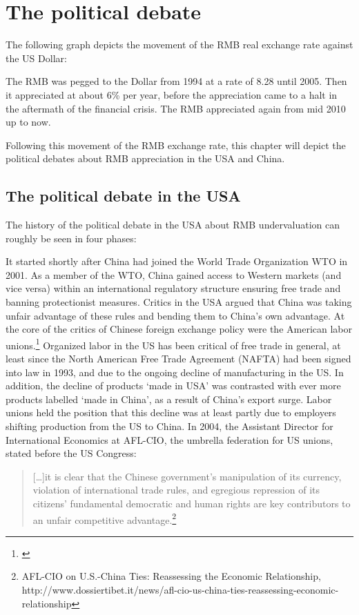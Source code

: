 \section{The political debate}
\label{sec:politics}

The following graph depicts the movement of the RMB real exchange rate against the US Dollar:


The RMB was pegged to the Dollar from 1994 at a rate of 8.28 until 2005. Then it appreciated at about 6\% per year, before the appreciation came to a halt in the aftermath of the financial crisis. The RMB appreciated again from mid 2010 up to now.

Following this movement of the RMB exchange rate, this chapter will depict the political debates about RMB appreciation in the USA and China.


\subsection{The political debate in the USA}

The history of the political debate in the USA about RMB undervaluation can roughly be seen in four phases:

It started shortly after China had joined the World Trade Organization WTO in 2001. As a member of the WTO, China gained access to Western markets (and vice versa) within an international regulatory structure ensuring free trade and banning protectionist measures. Critics in the USA argued that China was taking unfair advantage of these rules and bending them to China's own advantage. At the core of the critics of Chinese foreign exchange policy were the American labor unions.\footnote{\cite[pp. 14]{Levy2011}} Organized labor in the US has been critical of free trade in general, at least since the North American Free Trade Agreement (NAFTA) had been signed into law in 1993, and due to the ongoing decline of manufacturing in the US. In addition, the decline of products `made in USA'  was contrasted with ever more products labelled `made in China', as a result of China's export surge. Labor unions held the position that this decline was at least partly due to employers shifting production from the US to China. In 2004, the Assistant Director for International Economics at AFL-CIO, the umbrella federation for US unions, stated before the US Congress: 

\begin{quote}
[\dots]it is clear that the Chinese government’s manipulation of its currency, violation of international trade rules, and egregious repression of its citizens’ fundamental democratic and human rights are key contributors to an unfair competitive advantage.\footnote{AFL-CIO on U.S.-China Ties: Reassessing the Economic Relationship, http://www.dossiertibet.it/news/afl-cio-us-china-ties-reassessing-economic-relationship}
\end{quote}

